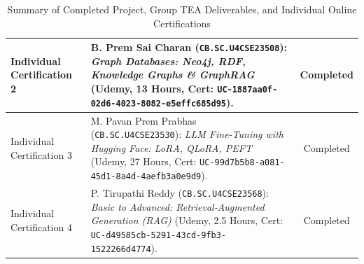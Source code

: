 \documentclass[11pt, a4paper]{article}
\begin{document}
\begin{table}[H]
\begin{tabular}{|p{4.0cm}|p{8.0cm}|c|}
        \hline
        Individual Certification 2 & B. Prem Sai Charan (\texttt{CB.SC.U4CSE23508}): \textit{Graph Databases: Neo4j, RDF, Knowledge Graphs \& GraphRAG} (Udemy, 13 Hours, Cert: \texttt{UC-1887aa0f-02d6-4023-8082-e5effc685d95}). & Completed \\
        \hline
        Individual Certification 3 & M. Pavan Prem Prabhas (\texttt{CB.SC.U4CSE23530}): \textit{LLM Fine-Tuning with Hugging Face: LoRA, QLoRA, PEFT} (Udemy, 27 Hours, Cert: \texttt{UC-99d7b5b8-a081-45d1-8a4d-4aefb3a0e9d9}). & Completed \\
        \hline
        Individual Certification 4 & P. Tirupathi Reddy (\texttt{CB.SC.U4CSE23568}): \textit{Basic to Advanced: Retrieval-Augmented Generation (RAG)} (Udemy, 2.5 Hours, Cert: \texttt{UC-d49585cb-5291-43cd-9fb3-1522266d4774}). & Completed \\
        \hline
    \end{tabular}
    \caption{Summary of Completed Project, Group TEA Deliverables, and Individual Online Certifications}
\end{table}

\vspace{0.2cm}
\nocite{*}
\renewcommand{\refname}{\large\bfseries\color{amritaMaroon}References}


\end{document}
